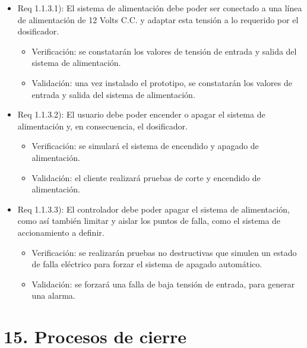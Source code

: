 \documentclass[
11pt, %
]{charter}
\begin{document}
\begin{itemize}
\item Req 1.1.3.1): El sistema de alimentación debe poder ser conectado a una línea de alimentación de 12 Volts C.C. y adaptar esta tensión a lo requerido por el dosificador.

\begin{itemize}
	\item Verificación: se constatarán los valores de tensión de entrada y salida del sistema de alimentación.
	\item Validación: una vez instalado el prototipo, se constatarán los valores de entrada y salida del sistema de alimentación.
\end{itemize}

\item Req 1.1.3.2): El usuario debe poder encender o apagar el sistema de alimentación y, en consecuencia, el dosificador.

\begin{itemize}
	\item Verificación: se simulará el sistema de encendido y apagado de alimentación.
	\item Validación: el cliente realizará pruebas de corte y encendido de alimentación.
\end{itemize}

\item Req 1.1.3.3): El controlador debe poder apagar el sistema de alimentación, como así también limitar y aislar los puntos de falla, como el sistema de accionamiento a definir.

\begin{itemize}
	\item Verificación: se realizarán pruebas no destructivas que simulen un estado de falla eléctrico para forzar el sistema de apagado automático.
	\item Validación: se forzará una falla de baja tensión de entrada, para generar una alarma.
\end{itemize}

\end{itemize}


\section{15. Procesos de cierre}    
\label{sec:cierre}
\end{document}
